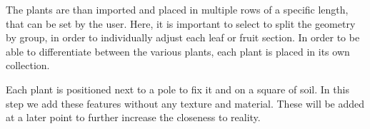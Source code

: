 \vspace{5pt}


The plants are than imported and placed in multiple rows of a specific length, that can be set by the user. Here, it is important to select to split the geometry by group, in order to individually adjust each leaf or fruit section. In order to be able to differentiate between the various plants, each plant is placed in its own collection. 

\vspace{5pt}

Each plant is positioned next to a pole to fix it and on a square of soil. In this step we add these features without any texture and material. These will be added at a later point to further increase the closeness to reality. 

\vspace{5pt}

